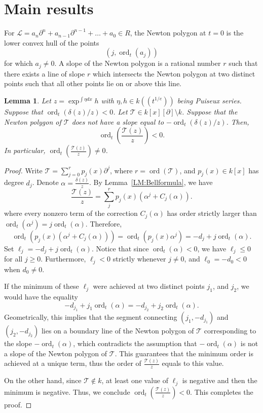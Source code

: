 \documentclass{article}
\newtheorem{lemma}[theorem]{Lemma}
\DeclareMathOperator{\ord}{ord}
\newcommand{\pa}{\partial}
\newcommand{\calL}{{\mathcal{L}}}
\newcommand{\calT}{{\mathcal{T}}}
\begin{document}
\section{Main results}
For $\calL=a_n\pa^n+a_{n-1}\pa^{n-1}+\dots+a_0 \in R$, 
the Newton polygon at $t=0$ is the lower convex hull of the points
\[
  (j,\ord_t(a_j))
\]
for which $a_j\ne0$.
A slope of the Newton polygon is a rational number $r$ such that there exists a line of slope $r$ 
which intersects the Newton polygon at two distinct points such that all other points lie on or above this line.
\begin{lemma}
  \label{LM:non-resonant-image-gap}
Let $z=\exp^{\int \eta dx}h$ with $\eta,h\in k((t^{1/e}))$ being Puiseux series. Suppose that
 $\ord_t(\delta(z)/z) < 0$.
Let $\calT \in k[x][\pa]\setminus k$. Suppose that the Newton polygon
of $\calT$ does not have a slope equal to $-\ord_t(\delta(z)/z)$.
Then,
\[ \ord_t\left(\frac{\calT(z)}{z}\right) < 0. \]
In particular, $\ord_t\left(\frac{\calT(z)}{z}\right) \ne 0$.
\end{lemma}
\begin{proof}
Write $\calT = \sum_{j=0}^r p_j(x)\pa^j$, where $r = \ord(\calT)$, and $p_j(x)\in k[x]$ has degree $d_j$.
Denote $\alpha = \frac{\delta(z)}{z}$. 
By Lemma~\ref{LM:Bellformula}, we have
\[ \frac{\calT(z)}{z} = \sum_j^r p_j(x) \left(\alpha^j + C_j(\alpha)\right). \]
where every nonzero term of the correction $C_j(\alpha)$ has order strictly larger than 
$\ord_t(\alpha^j)=j\ord_t(\alpha)$. Therefore, 
\[
  \ord_t(p_j(x)(\alpha^j+C_j(\alpha))) = \ord_t(p_j(x) \alpha^j) = -d_j + j\ord_t(\alpha). 
\]
Set $\ell_j=-d_j + j\ord_t(\alpha).$
Notice that since $\ord_t(\alpha) < 0$, we have $\ell_j \le 0$ for all $j \ge 0$. 
Furthermore, $\ell_j < 0$ strictly whenever $j \ne 0$, and $\ell_0=-d_0 < 0$ when $d_0 \ne 0$.

If the minimum of these $\ell_j$ were achieved at two distinct points $j_1$, and $j_2$, we would have the equality
\[ -d_{j_1}+j_1\ord_t(\alpha) = -d_{j_2}+j_2\ord_t(\alpha). \]
Geometrically, this implies that the segment connecting $(j_1, -d_{j_1})$ and $(j_2, -d_{j_2})$ lies on a 
boundary line of the Newton polygon of $\calT$ corresponding to the slope $-\ord_t(\alpha)$, 
which contradicts the assumption that $-\ord_t(\alpha)$ is not a slope of the Newton polygon of $\calT$.
This guarantees that the minimum order is achieved at a unique term, thus the order of $\frac{\calT(z)}{z}$ equals to this value.

On the other hand, since $\calT \notin k$, at least one value of $\ell_j$ is negative and then the minimum is negative. Thus, we conclude
$\ord_t\left(\frac{\calT(z)}{z}\right)< 0. $
This completes the proof.
\end{proof}
\end{document}
